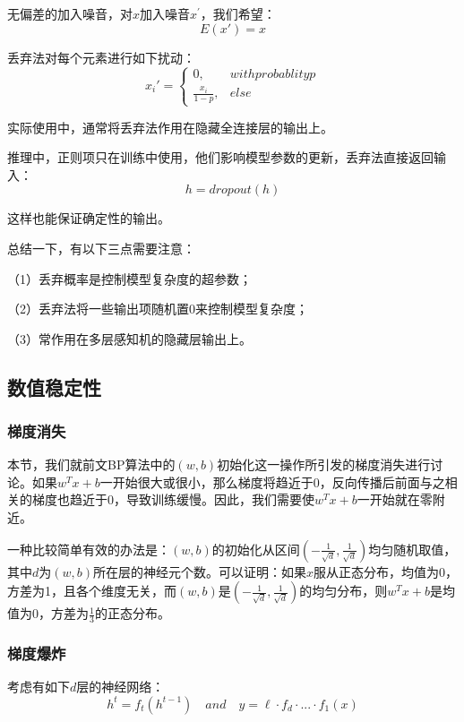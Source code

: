 无偏差的加入噪音，对$x$加入噪音$x^{\prime}$，我们希望：
\begin{equation}E(x')=x\end{equation}

丢弃法对每个元素进行如下扰动：
\begin{equation}x_i'=\begin{cases}0 ,&with p robablity p\\[2ex]\frac{x_i}{1-p},&else\end{cases}\end{equation}

实际使用中，通常将丢弃法作用在隐藏全连接层的输出上。

推理中，正则项只在训练中使用，他们影响模型参数的更新，丢弃法直接返回输入：
\begin{equation}h=dropout(h)\end{equation}

这样也能保证确定性的输出。

总结一下，有以下三点需要注意：

（1）丢弃概率是控制模型复杂度的超参数；

（2）丢弃法将一些输出项随机置0来控制模型复杂度；

（3）常作用在多层感知机的隐藏层输出上。

\subsection{数值稳定性}
\subsubsection{梯度消失}
本节，我们就前文BP算法中的$(w,b)$初始化这一操作所引发的梯度消失进行讨论。如果$w^Tx+b$一开始很大或很小，那么梯度将趋近于0，反向传播后前面与之相关的梯度也趋近于0，导致训练缓慢。因此，我们需要使$w^Tx+b$一开始就在零附近。

一种比较简单有效的办法是：$(w,b)$的初始化从区间$(-\frac1{\sqrt{d}},\frac1{\sqrt{d}})$均匀随机取值，其中$d$为$(w,b)$所在层的神经元个数。可以证明：如果$x$服从正态分布，均值为0，方差为1，且各个维度无关，而$(w,b)$是$(-\frac1{\sqrt{d}},\frac1{\sqrt{d}})$的均匀分布，则$w^Tx+b$是均值为0，方差为$\frac13$的正态分布。

\subsubsection{梯度爆炸}
考虑有如下$d$层的神经网络：
\begin{equation}h^t=f_t(h^{t-1})\quad and\quad y=\ell\cdot f_d\cdot...\cdot f_1(x)\end{equation}

